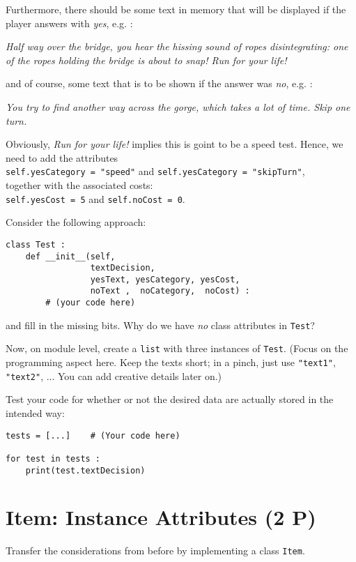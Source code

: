 \documentclass[
	english,
	fontsize=10pt,
	parskip=half,
	titlepage=true,
	DIV=12
]{scrartcl}
\newcommand*{\inPy}[1]{\texttt{#1}}
\newcommand*{\eg}{e.\;g. }
\begin{document}
Furthermore, there should be some text in memory that will be displayed if the player answers with \emph{yes}, \eg:
\begin{center}
	\emph{Half way over the bridge, you hear the hissing sound of ropes disintegrating: one of the ropes holding the bridge is about to snap! Run for your life!}
\end{center}

and of course, some text that is to be shown if the answer was \emph{no}, \eg:
\begin{center}
	\emph{You try to find another way across the gorge, which takes a lot of time. Skip one turn.}
\end{center}

Obviously, \emph{Run for your life!} implies this is goint to be a speed test. Hence, we need to add the attributes\\
\inPy{self.yesCategory = "speed"} and \inPy{self.yesCategory = "skipTurn"},\\
together with the associated costs:\\
\inPy{self.yesCost = 5} and \inPy{self.noCost = 0}.

Consider the following approach:
\begin{verbatim}
class Test :
    def __init__(self,
                 textDecision,
                 yesText, yesCategory, yesCost,
                 noText ,  noCategory,  noCost) :
        # (your code here)
\end{verbatim}

and fill in the missing bits. Why do we have \emph{no} class attributes in \texttt{Test}?

Now, on module level, create a \inPy{list} with three instances of \texttt{Test}. (Focus on the programming aspect here. Keep the texts short; in a pinch, just use \inPy{"text1"}, \inPy{"text2"}, ... You can add creative details later on.)

Test your code for whether or not the desired data are actually stored in the intended way:
\begin{verbatim}
tests = [...]    # (Your code here)

for test in tests :
    print(test.textDecision)
\end{verbatim}

\section{Item: Instance Attributes (2 P)}
Transfer the considerations from before by implementing a class \texttt{Item}.
\end{document}
